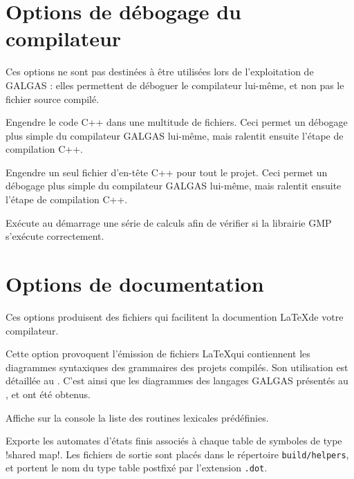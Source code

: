 \section{Options de débogage du compilateur}

Ces options ne sont pas destinées à être utilisées lors de l'exploitation de GALGAS : elles permettent de déboguer le compilateur lui-même, et non pas le fichier source compilé.



 Engendre le code C++ dans une multitude de fichiers. Ceci permet un débogage plus simple du compilateur GALGAS lui-même, mais ralentit ensuite l'étape de compilation C++.


 Engendre un seul fichier d'en-tête C++ pour tout le projet. Ceci permet un débogage plus simple du compilateur GALGAS lui-même, mais ralentit ensuite l'étape de compilation C++.


 Exécute au démarrage une série de calculs afin de vérifier si la librairie GMP s'exécute correctement.





\section{Options de documentation}

Ces options produisent des fichiers qui facilitent la documention \LaTeX de votre compilateur.

 Cette option provoquent l'émission de fichiers \LaTeX qui contiennent les diagrammes syntaxiques des grammaires des projets compilés. Son utilisation est détaillée au . C'est ainsi que les diagrammes des langages GALGAS présentés au ,  et  ont été obtenus.





 Affiche sur la console la liste des routines lexicales prédéfinies.




 Exporte les automates d'états finis associés à chaque table de symboles de type \ggs!shared map!. Les fichiers de sortie sont placés dans le répertoire \texttt{build/helpers}, et portent le nom du type table postfixé par l'extension \texttt{.dot}.





